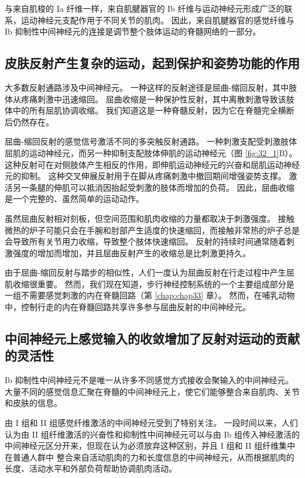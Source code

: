 与来自肌梭的 Ia 纤维一样，来自肌腱器官的 Ib 纤维与运动神经元形成广泛的联系，运动神经元支配作用于不同关节的肌肉。 因此，来自肌腱器官的感觉纤维与 Ib 抑制性中间神经元的连接是调节整个肢体运动的脊髓网络的一部分。

\subsection{皮肤反射产生复杂的运动，起到保护和姿势功能的作用}
大多数反射通路涉及中间神经元。 一种这样的反射途径是屈曲-缩回反射，其中肢体从疼痛刺激中迅速缩回。 屈曲收缩是一种保护性反射，其中离散刺激导致该肢体中的所有屈肌协调收缩。 我们知道这是一种脊髓反射，因为它在脊髓完全横断后仍然存在。

屈曲-缩回反射的感觉信号激活不同的多突触反射通路。 一种刺激支配受刺激肢体屈肌的运动神经元，而另一种抑制支配肢体伸肌的运动神经元（图 \ref{fig:32_1}B）。 这种反射可在对侧肢体产生相反的作用，即伸肌运动神经元的兴奋和屈肌运动神经元的抑制。 这种交叉伸展反射用于在脚从疼痛刺激中撤回期间增强姿势支撑。 激活另一条腿的伸肌可以抵消因抬起受刺激的肢体而增加的负荷。 因此，屈曲收缩是一个完整的、虽然简单的运动动作。

虽然屈曲反射相对刻板，但空间范围和肌肉收缩的力量都取决于刺激强度。 接触微热的炉子可能只会在手腕和肘部产生适度的快速缩回，而接触非常热的炉子总是会导致所有关节用力收缩，导致整个肢体快速缩回。 反射的持续时间通常随着刺激强度的增加而增加，并且屈曲反射产生的收缩总是比刺激更持久。

由于屈曲-缩回反射与踏步的相似性，人们一度认为屈曲反射在行走过程中产生屈肌收缩很重要。 然而，我们现在知道，步行神经控制系统的一个主要组成部分是一组不需要感觉刺激的内在脊髓回路（第 \ref{chap:chap33} 章）。 然而，在哺乳动物中，控制行走的内在脊髓回路共享许多参与屈曲反射的中间神经元。

\subsection{中间神经元上感觉输入的收敛增加了反射对运动的贡献的灵活性}

Ib 抑制性中间神经元不是唯一从许多不同感觉方式接收会聚输入的中间神经元。 大量不同的感觉信息汇聚在脊髓的中间神经元上，使它们能够整合来自肌肉、关节和皮肤的信息。

由 I 组和 II 组感觉纤维激活的中间神经元受到了特别关注。 一段时间以来，人们认为由 II 组纤维激活的兴奋性和抑制性中间神经元可以与由 Ib 组传入神经激活的中间神经元区分开来，但现在认为必须放弃这种区别，并且 I 组和 II 组纤维集中在普通人群中 整合来自活动肌肉的力和长度信息的中间神经元，从而根据肌肉的长度、活动水平和外部负荷帮助协调肌肉活动。

